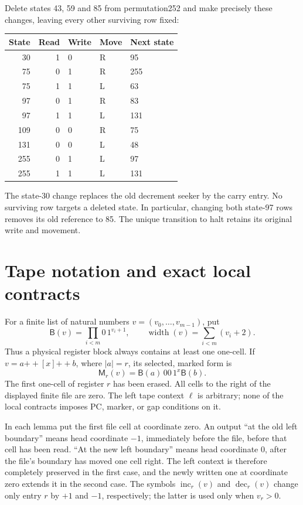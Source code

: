 \documentclass[11pt]{article}
\newcommand{\B}{\mathsf B}
\newcommand{\M}{\mathsf M}
\newcommand{\width}{\operatorname{width}}
\newcommand{\Inc}{\operatorname{inc}}
\newcommand{\Dec}{\operatorname{dec}}
\newcommand{\concat}{\mathbin{+\!+}}
\begin{document}
Delete states 43, 59 and 85 from permutation252 and make precisely these
changes, leaving every other surviving row fixed:
\begin{center}
\begin{tabular}{rrlll}
\toprule
State & Read & Write & Move & Next state\\
\midrule
30 & 1 & 0 & R & 95\\
75 & 0 & 1 & R & 255\\
75 & 1 & 1 & L & 63\\
97 & 0 & 1 & R & 83\\
97 & 1 & 1 & L & 131\\
109 & 0 & 0 & R & 75\\
131 & 0 & 0 & L & 48\\
255 & 0 & 1 & L & 97\\
255 & 1 & 1 & L & 131\\
\bottomrule
\end{tabular}
\end{center}
The state-30 change replaces the old decrement seeker by the carry entry.
No surviving row targets a deleted state.  In
particular, changing both state-97 rows removes its old reference to 85.
The unique transition to halt retains its original write and movement.

\section{Tape notation and exact local contracts}

For a finite list of natural numbers $v=(v_0,\ldots,v_{m-1})$, put
\[
 \B(v)=\prod_{i<m} 0\,1^{v_i+1},\qquad
 \width(v)=\sum_{i<m}(v_i+2).
\]
Thus a physical register block always contains at least one one-cell.  If
$v=a\concat[x]\concat b$, where $|a|=r$, its selected, marked form is
\[
 \M_r(v)=\B(a)\,00\,1^x\B(b).
\]
The first one-cell of register $r$ has been erased.  All cells to the right
of the displayed finite file are zero.  The left tape context $\ell$ is
arbitrary; none of the local contracts imposes PC, marker, or gap conditions
on it.

In each lemma put the first file cell at coordinate zero.  An output ``at
the old left boundary'' means head coordinate $-1$, immediately before the
file, before that cell has been read.  ``At the new left boundary'' means
head coordinate $0$, after the file's boundary has moved one cell right.
The left context is therefore completely preserved in the first case,
and the newly written one at coordinate zero extends it in the second case.
The symbols $\Inc_r(v)$ and $\Dec_r(v)$ change only entry $r$ by $+1$ and
$-1$, respectively; the latter is used only when $v_r>0$.
\end{document}
